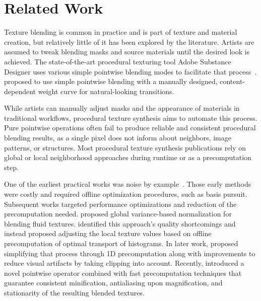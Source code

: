 \section{Related Work}

Texture blending is common in practice and is part of texture and material creation, but relatively little of it has been explored by the literature.
Artists are assumed to tweak blending masks and source materials until the desired look is achieved.
The state-of-the-art procedural texturing tool Adobe Substance Designer uses various simple pointwise blending modes to facilitate that process~\cite{substanceblending}.
\citet{Mikkelsen2022Hex} proposed to use simple pointwise blending with a manually designed, content-dependent weight curve for natural-looking transitions.

While artists can manually adjust masks and the appearance of materials in traditional workflows, procedural texture synthesis aims to automate this process.
Pure pointwise operations often fail to produce reliable and consistent procedural blending results, as a single pixel does not inform about neighbors, image patterns, or structures.
Most procedural texture synthesis publications rely on global or local neighborhood approaches during runtime or as a precomputation step.

One of the earliest practical works was noise by example~\cite{galerne2012gabor}.
Those early methods were costly and required offline optimization procedures, such as basis pursuit.
Subsequent works targeted performance optimizations and reduction of the precomputation needed.
\citet{yu2010lagrangian} proposed global variance-based normalization for blending fluid textures. 
\citet{heitz2018high} identified this approach's quality shortcomings and instead proposed adjusting the local texture values based on offline precomputation of optimal transport of histograms.
In later work, \citet{burley2019histogram} proposed simplifying that process through 1D precomputation along with improvements to reduce visual artifacts by taking clipping into account.
Recently, \citet{fourniersauvage2024mixmax} introduced a novel pointwise operator combined with fast precomputation techniques that guarantee consistent minification, antialiasing upon magnification, and stationarity of the resulting blended textures.

\enlargethispage{3pt}